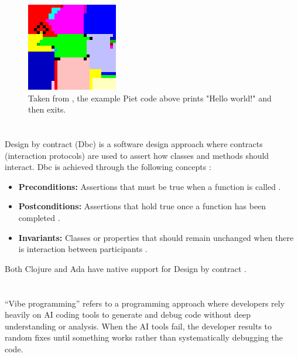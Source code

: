 \documentclass{article}
\begin{document}
\begin{figure}[H]
    \centering
    \includegraphics[width=0.5\linewidth]{Piet_hello_big.png}
    \caption{Taken from \cite{MorganMar}, the example Piet code above prints "Hello world!" and then exits.}
\end{figure}


\section{}
Design by contract (Dbc) is a software design approach where contracts (interaction protocols) are used to assert how classes and methods should interact. Dbc is achieved through the following concepts \cite{Nicolette}:
\begin{itemize}
    \item \textbf{Preconditions:} Assertions that must be true when a function is called \cite{Kaushik}.
\end{itemize}
\begin{itemize}
    \item \textbf{Postconditions:} Assertions that hold true once a function has been completed \cite{Kaushik}.
\end{itemize}
\begin{itemize}
    \item \textbf{Invariants:} Classes or properties that should remain unchanged when there is interaction between participants \cite{Kaushik}.
\end{itemize}

Both Clojure and Ada have native support for Design by contract \cite{DesignByContractWiki}.


\section{}
“Vibe programming” refers to a programming approach where developers rely heavily on AI coding tools to generate and debug code without deep understanding or analysis. When the AI tools fail, the developer results to random fixes until something works rather than systematically debugging the code.
\end{document}

